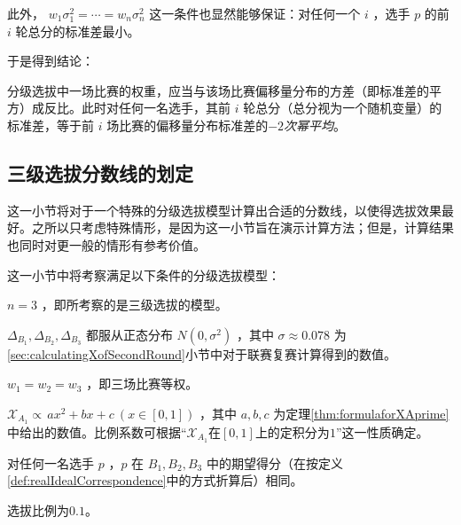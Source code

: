         此外， $w_1\sigma_1^2=\cdots=w_n\sigma_n^2$ 这一条件也显然能够保证：对任何一个 $i$ ，选手 $p$ 的前 $i$ 轮总分的标准差最小。

        \vspace{1.5ex}

        于是得到结论：

        \begin{tcolorbox}[colback=white,colframe=black,boxrule=0.5pt,arc=0pt]
            分级选拔中一场比赛的权重，应当与该场比赛偏移量分布的方差（即标准差的平方）成反比。此时对任何一名选手，其前 $i$ 轮总分（总分视为一个随机变量）的标准差，等于前 $i$ 场比赛的偏移量分布标准差的\emph{$-2$次幂平均}。
        \end{tcolorbox}
    
    \subsection{三级选拔分数线的划定}

        这一小节将对于一个特殊的分级选拔模型计算出合适的分数线，以使得选拔效果最好。之所以只考虑特殊情形，是因为这一小节旨在演示计算方法；但是，计算结果也同时对更一般的情形有参考价值。

        \vspace{1.5ex}

        这一小节中将考察满足以下条件的分级选拔模型：
        \begin{asparaitem}
            \item $n=3$ ，即所考察的是三级选拔的模型。
            \item $\Delta_{B_1},\Delta_{B_2},\Delta_{B_3}$ 都服从正态分布 $N(0,\sigma^2)$ ，其中 $\sigma\approx 0.078$ 为\ref{sec:calculatingXofSecondRound}小节中对于联赛复赛计算得到的数值。
            \item $w_1=w_2=w_3$ ，即三场比赛等权。
            \item $\mathcal{X}_{A_1}\propto\, ax^2+bx+c \  (x\in [0,1])$ ，其中 $a,b,c$ 为定理\ref{thm:formulaforXAprime}中给出的数值。比例系数可根据“$\mathcal{X}_{A_1}$在$[0,1]$上的定积分为$1$”这一性质确定。
            \item 对任何一名选手 $p$ ，$p$ 在 $B_1,B_2,B_3$ 中的期望得分（在按定义\ref{def:realIdealCorrespondence}中的方式折算后）相同。
            \item 选拔比例为$0.1$。
        \end{asparaitem}

        \vspace{1.5ex}

